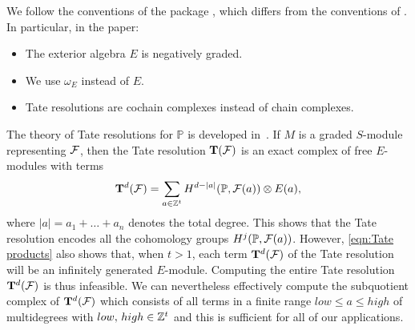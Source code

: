 \documentclass[twoside,12pt, leqno]{amsart}
\def\PP{{\mathbb P}}
\def\bT{{\bf T}}
\begin{document}
\begin{remark}\label{rmk:conventions}
We follow the conventions of the package \cite{TateOnProducts}, which differs from the conventions of \cite{EES}. In particular, in the paper:
\begin{itemize}
\item The exterior algebra $E$ is negatively graded.
\item We use $\omega_E$ instead of $E.$
\item Tate resolutions are cochain complexes instead of chain complexes.
\end{itemize}
\end{remark}

The theory of Tate resolutions for 
$
\PP$ is developed in~\cite{EES}.  If $M$ is a graded $S$-module representing ${\mathcal F}$, then the Tate resolution $\bT(\sF)$ is an
exact complex of free $E$-modules with terms
\begin{equation}\label{eqn:Tate products}
\bT^d(\sF)= \sum_{a \in \ZZ^t} H^{d-|a|}(\PP,\sF(a)) \otimes E(a),
\end{equation}
where $|a|=a_1+\ldots+a_n$ denotes the total degree.
This shows that the Tate resolution encodes all the cohomology groups
$ H^j(\PP, \sF(a))$.
However, \eqref{eqn:Tate products} also shows that, when $t>1$, each term $\bT^d(\sF)$ of the Tate resolution will be an infinitely generated $E$-module. Computing the entire Tate resolution $\bT^d(\sF)$ is thus infeasible.  We can nevertheless  effectively compute the subquotient complex of $\bT^d(\sF)$ which consists of all terms in a finite range
$
low \le a \le high
$
of multidegrees with $low, \, high \in {\mathbb Z}^t $ and this is sufficient for all of our applications.


\end{document}
